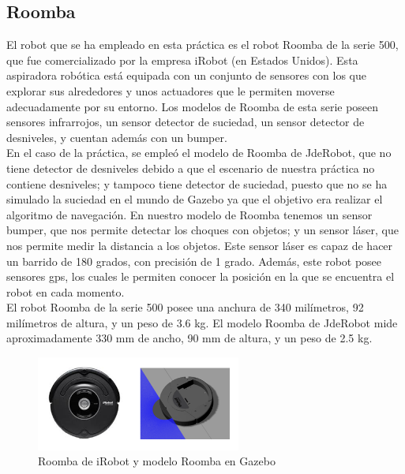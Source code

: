\subsection{Roomba}
El robot que se ha empleado en esta práctica es el robot Roomba de la serie 500, que fue comercializado por la empresa iRobot (en Estados Unidos). Esta aspiradora robótica está equipada con un conjunto de sensores con los que explorar sus alrededores y unos actuadores que le permiten moverse adecuadamente por su entorno. Los modelos de Roomba de esta serie poseen sensores infrarrojos, un sensor detector de suciedad, un sensor detector de desniveles, y cuentan además con un bumper.\\

En el caso de la práctica, se empleó el modelo de Roomba de JdeRobot, que no tiene detector de desniveles debido a que el escenario de nuestra práctica no contiene desniveles; y tampoco tiene detector de suciedad, puesto que no se ha simulado la suciedad en el mundo de Gazebo ya que el objetivo era realizar el algoritmo de navegación. En nuestro modelo de Roomba tenemos un sensor bumper, que nos permite detectar los choques con objetos; y un sensor láser, que nos permite medir la distancia a los objetos. Este sensor láser es capaz de hacer un barrido de 180 grados, con precisión de 1 grado. Además, este robot posee sensores \acrshort{gps}, los cuales le permiten conocer la posición en la que se encuentra el robot en cada momento.\\

El robot Roomba de la serie 500 posee una anchura de 340 milímetros, 92 milímetros de altura, y un peso de 3.6 kg. El modelo Roomba de JdeRobot mide aproximadamente 330 mm de ancho, 90 mm de altura, y un peso de 2.5 kg.\\

\begin{figure}[H]
  \begin{center}
    \includegraphics[width=0.6\textwidth]{figures/Vacuum/Roombas.png}
		\caption{Roomba de iRobot y modelo Roomba en Gazebo}
		\label{fig.roombas}
		\end{center}
\end{figure}

